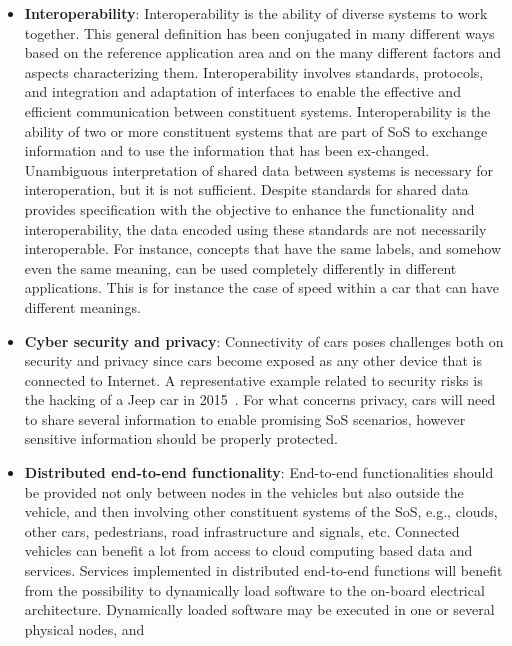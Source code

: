\begin{itemize}
\item {\bf Interoperability}: Interoperability is the ability of diverse systems to work together. This general definition has been conjugated in many different ways based on the reference application area and on the many different factors and aspects characterizing them. Interoperability involves standards, protocols, and integration and adaptation of interfaces to enable the effective and efficient communication between constituent systems. Interoperability is the ability of two or more constituent systems that are part of SoS to exchange information and to use the information that has been ex-changed. Unambiguous interpretation of shared data between systems is necessary for interoperation, but it is not sufficient. Despite standards for shared data provides specification with the objective to enhance the functionality and interoperability, the data encoded using these standards are not necessarily interoperable. For instance, concepts that have the same labels, and somehow even the same meaning, can be used completely differently in different applications. This is for instance the case of speed within a car that can have different meanings.
\item {\bf Cyber security and privacy}:
Connectivity of cars poses challenges both on security and privacy since cars become exposed as any other device that is connected to Internet. A representative example related to security risks is the hacking of a Jeep car in 2015~\cite{jeep}. For what concerns privacy, cars will need to share several information to enable promising SoS scenarios, however sensitive information should be properly protected.
\item {\bf Distributed end-to-end functionality}: End-to-end functionalities should be provided not only between nodes in the vehicles but also outside the vehicle, and then involving other constituent systems of the SoS, e.g., clouds, other cars, pedestrians, road infrastructure and signals, etc. Connected vehicles can benefit a lot from access to cloud computing based data and services. %
Services implemented in distributed end-to-end functions will benefit from the possibility to dynamically load software to the on-board electrical architecture. Dynamically loaded software may be executed in one or several physical nodes, and %

\end{itemize}
